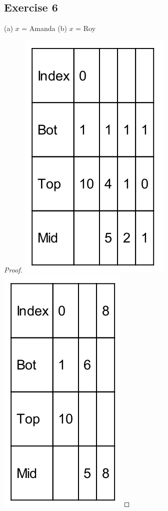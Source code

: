 \documentclass[14pt]{extarticle}
\begin{document}
\subsection{Exercise 6}
(a) \(x\) = Amanda (b) \(x\) = Roy
\begin{proof}
\includegraphics[scale=0.3]{../images/11.5.6.a.png}
\includegraphics[scale=0.3]{../images/11.5.6.b.png}
\end{proof}
\end{document}
